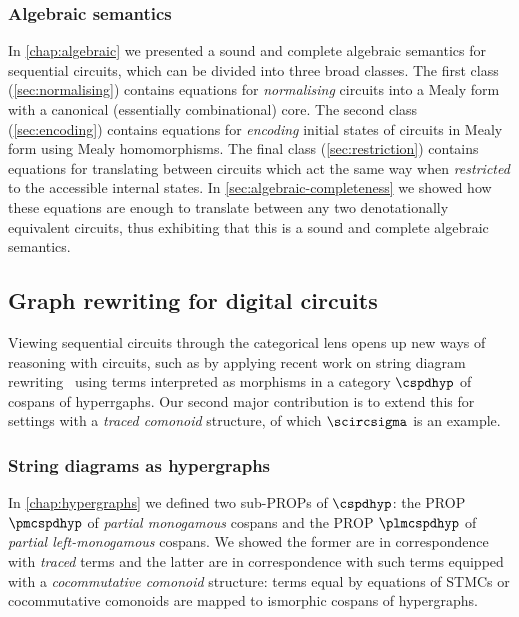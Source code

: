 \subsubsection{Algebraic semantics}

In \cref{chap:algebraic} we presented a sound and complete algebraic semantics
for sequential circuits, which can be divided into three broad classes.
The first class (\cref{sec:normalising}) contains equations for
\emph{normalising} circuits into a Mealy form with a canonical (essentially
combinational) core.
The second class (\cref{sec:encoding}) contains equations for \emph{encoding}
initial states of circuits in Mealy form using Mealy homomorphisms.
The final class (\cref{sec:restriction}) contains equations for translating
between circuits which act the same way when \emph{restricted} to the
accessible internal states.
In \cref{sec:algebraic-completeness} we showed how these equations are enough to
translate between any two denotationally equivalent circuits, thus exhibiting
that this is a sound and complete algebraic semantics.

\subsection{Graph rewriting for digital circuits}

Viewing sequential circuits through the categorical lens opens up new ways of
reasoning with circuits, such as by applying recent work on string diagram
rewriting~\cite{bonchi2022string,bonchi2022stringa} using terms interpreted as
morphisms in a category \(\cspdhyp\) of cospans of hyperrgaphs.
Our second major contribution is to extend this for settings with a
\emph{traced comonoid} structure, of which \(\scircsigma\) is an example.

\subsubsection{String diagrams as hypergraphs}

In \cref{chap:hypergraphs} we defined two sub-PROPs of \(\cspdhyp\):
the PROP \(\pmcspdhyp\) of \emph{partial monogamous} cospans and
the PROP \(\plmcspdhyp\) of \emph{partial left-monogamous} cospans.
We showed the former are in correspondence with \emph{traced} terms and the
latter are in correspondence with such terms equipped with a
\emph{cocommutative comonoid} structure: terms equal by equations of STMCs or
cocommutative comonoids are mapped to ismorphic cospans of hypergraphs.

